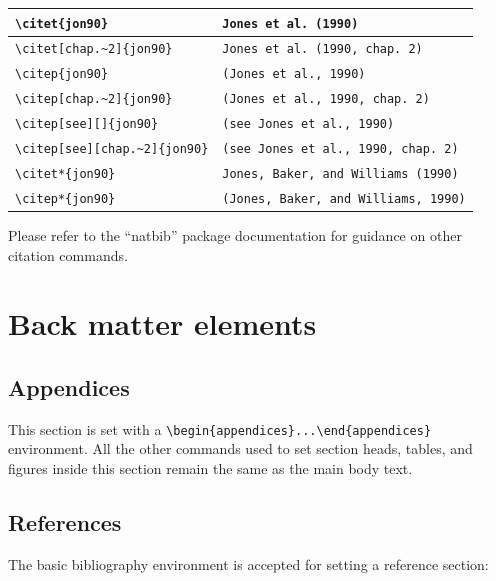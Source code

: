 \documentclass{article}
\begin{document}
\begin{center}\begin{tabular}{|l|l|}\hline
\verb+\citet{jon90}+&   \verb+Jones et al. (1990) +\\\hline
\verb+\citet[chap.~2]{jon90}+&  \verb+Jones et al. (1990, chap. 2) +\\\hline
\verb+\citep{jon90}+&   \verb+(Jones et al., 1990) +\\\hline
\verb+\citep[chap.~2]{jon90}+&  \verb+(Jones et al., 1990, chap. 2) +\\ \hline
\verb+\citep[see][]{jon90}+&    \verb+(see Jones et al., 1990) +\\\hline
\verb+\citep[see][chap.~2]{jon90}+&     \verb+(see Jones et al., 1990, chap. 2) +\\\hline
\verb+\citet*{jon90}+&  \verb+Jones, Baker, and Williams (1990) +\\\hline
\verb+\citep*{jon90}+&  \verb+(Jones, Baker, and Williams, 1990)+\\
\hline
\end{tabular}\end{center}
Please refer to the ``natbib'' package documentation for guidance on other citation commands.

\section{Back matter elements }
\subsection{Appendices}
This section is set with a \verb+\begin{appendices}...\end{appendices}+ environment. All the other commands used to set section heads, tables, and figures inside this section remain the same as the main body text.


\subsection{References}
The basic bibliography environment is accepted for setting a reference section:
\end{document}
